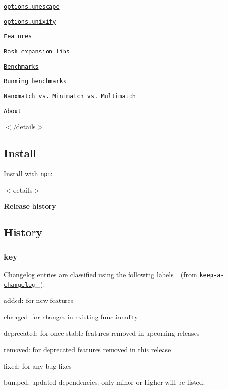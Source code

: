 \begin{DoxyItemize}
\begin{DoxyItemize}
\item \href{#optionsunescape}{\tt options.\+unescape}
\item \href{#optionsunixify}{\tt options.\+unixify}
\end{DoxyItemize}
\item \href{#features}{\tt Features}
\item \href{#bash-expansion-libs}{\tt Bash expansion libs}
\item \href{#benchmarks}{\tt Benchmarks}
\begin{DoxyItemize}
\item \href{#running-benchmarks}{\tt Running benchmarks}
\item \href{#nanomatch-vs-minimatch-vs-multimatch}{\tt Nanomatch vs. Minimatch vs. Multimatch}
\end{DoxyItemize}
\item \href{#about}{\tt About}
\end{DoxyItemize}

$<$/details$>$

\subsection*{Install}

Install with \href{https://www.npmjs.com/}{\tt npm}\+:




$<$details$>$ 

{\bfseries Release history}

\subsection*{History}

\subsubsection*{key}

Changelog entries are classified using the following labels \+\_\+(from \href{https://github.com/olivierlacan/keep-a-changelog}{\tt keep-\/a-\/changelog}\+\_\+)\+:


\begin{DoxyItemize}
\item {\ttfamily added}\+: for new features
\item {\ttfamily changed}\+: for changes in existing functionality
\item {\ttfamily deprecated}\+: for once-\/stable features removed in upcoming releases
\item {\ttfamily removed}\+: for deprecated features removed in this release
\item {\ttfamily fixed}\+: for any bug fixes
\item {\ttfamily bumped}\+: updated dependencies, only minor or higher will be listed.
\end{DoxyItemize}


